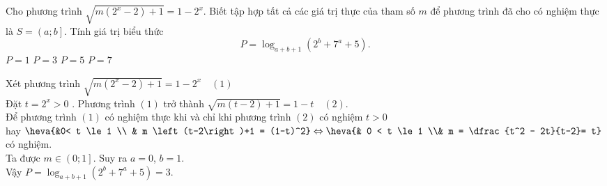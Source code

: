 \begin{ex}%
Cho phương trình $ \sqrt{m\left(2^x - 2\right)+1} =  1 - 2^x $. Biết tập hợp tất cả các giá trị thực của tham số $ m $	để phương trình đã cho có nghiệm thực là $ S = \left(a;b\right]. $ Tính giá trị biểu thức $$ P = \log_{a+b+1} \left(2^b + 7^a + 5\right). $$
	\choice
	{$ P = 1 $}
	{\True $ P = 3 $}
	{$ P = 5 $}
	{$ P = 7 $}
	\loigiai
	{Xét phương trình $ \sqrt{m\left(2^x - 2\right)+1} =  1 - 2^x \quad (1)$\\
Đặt $ t = 2^x > 0 $	. Phương trình $ (1) $ trở thành $ \sqrt{m\left(t-2\right)+1} = 1 - t \quad (2)$.\\
Để phương trình $ (1) $ có nghiệm thực khi và chỉ khi phương trình $ (2) $ có nghiệm $ t > 0 $\\ hay $ \heva{&0< t \le 1 \\ & m \left(t-2\right)+1 = (1-t)^2} \Leftrightarrow \heva{& 0 < t \le 1 \\& m = \dfrac{t^2 - 2t}{t-2}= t}  $ có nghiệm.\\
Ta được $ m \in \left(0;1\right] $. Suy ra $ a = 0 $, $  b = 1 $.\\
Vậy $ P = \log_{a+b+1} \left(2^b + 7^a + 5\right) = 3. $


}
\end{ex}

